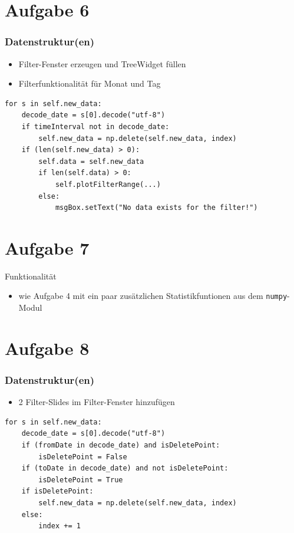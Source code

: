 \documentclass{beamer}
\begin{document}
    \section{Aufgabe 6}
    \begin{frame}[containsverbatim]
    	\frametitle{Datenstruktur(en)}
    	\begin{itemize}
    		\setlength\itemsep{1em}
    		\item Filter-Fenster erzeugen und TreeWidget füllen
    		\item Filterfunktionalität für Monat und Tag
    	\end{itemize}
    	\begin{lstlisting}
for s in self.new_data:
	decode_date = s[0].decode("utf-8")
	if timeInterval not in decode_date:
		self.new_data = np.delete(self.new_data, index)
	if (len(self.new_data) > 0):
		self.data = self.new_data
		if len(self.data) > 0:
			self.plotFilterRange(...)
		else:
			msgBox.setText("No data exists for the filter!")
    	\end{lstlisting}
    \end{frame}

    \section{Aufgabe 7}
    \begin{frame}{Funktionalität}
    	\begin{itemize}
    		\setlength\itemsep{1em}
    		\item wie Aufgabe 4 mit ein paar zusätzlichen Statistikfuntionen aus dem \lstinline{numpy}-Modul
    	\end{itemize}
    \end{frame}

    \section{Aufgabe 8}
    \begin{frame}[containsverbatim]
    	\frametitle{Datenstruktur(en)}
    	\begin{itemize}
    		\item 2 Filter-Slides im Filter-Fenster hinzufügen
    	\end{itemize}
    	\begin{lstlisting}
for s in self.new_data:
	decode_date = s[0].decode("utf-8")
	if (fromDate in decode_date) and isDeletePoint:
		isDeletePoint = False
	if (toDate in decode_date) and not isDeletePoint:
		isDeletePoint = True
	if isDeletePoint:
		self.new_data = np.delete(self.new_data, index)
	else:
		index += 1
    	\end{lstlisting}
    \end{frame}
\end{document}
